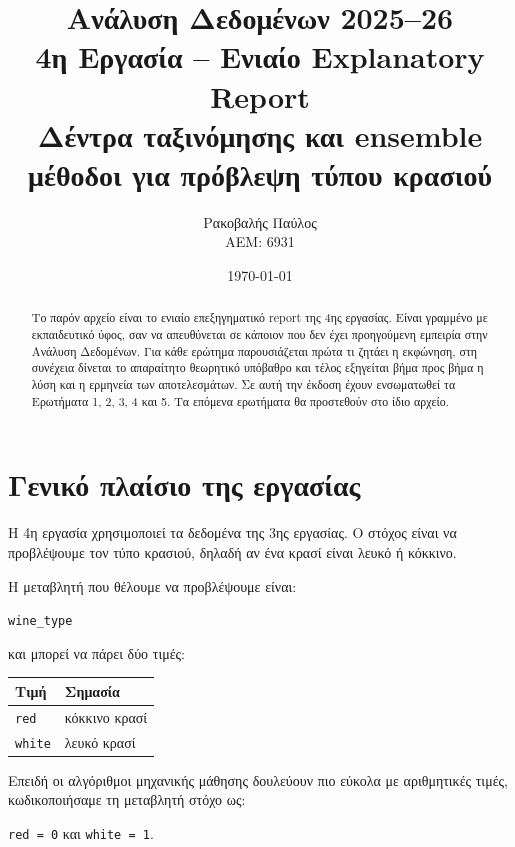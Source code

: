 \documentclass[12pt,a4paper]{article}
\title{
    \textbf{Ανάλυση Δεδομένων 2025--26}\\[0.25cm]
    \Large 4η Εργασία -- Ενιαίο Explanatory Report\\[0.15cm]
    \large Δέντρα ταξινόμησης και ensemble μέθοδοι για πρόβλεψη τύπου κρασιού
}
\author{
    Ρακοβαλής Παύλος\\
    ΑΕΜ: 6931
}
\date{\today}
\newcommand{\code}[1]{\texttt{\textenglish{#1}}}
\begin{document}
\maketitle
\thispagestyle{fancy}

\begin{abstract}
Το παρόν αρχείο είναι το ενιαίο επεξηγηματικό report της 4ης εργασίας. Είναι
γραμμένο με εκπαιδευτικό ύφος, σαν να απευθύνεται σε κάποιον που δεν έχει
προηγούμενη εμπειρία στην Ανάλυση Δεδομένων. Για κάθε ερώτημα παρουσιάζεται
πρώτα τι ζητάει η εκφώνηση, στη συνέχεια δίνεται το απαραίτητο θεωρητικό
υπόβαθρο και τέλος εξηγείται βήμα προς βήμα η λύση και η ερμηνεία των
αποτελεσμάτων. Σε αυτή την έκδοση έχουν ενσωματωθεί τα Ερωτήματα 1, 2, 3, 4
και 5.
Τα επόμενα ερωτήματα θα προστεθούν στο ίδιο αρχείο.
\end{abstract}

\tableofcontents
\newpage

\section{Γενικό πλαίσιο της εργασίας}

Η 4η εργασία χρησιμοποιεί τα δεδομένα της 3ης εργασίας. Ο στόχος είναι να
προβλέψουμε τον τύπο κρασιού, δηλαδή αν ένα κρασί είναι λευκό ή κόκκινο.

Η μεταβλητή που θέλουμε να προβλέψουμε είναι:

\begin{center}
\code{wine\_type}
\end{center}

και μπορεί να πάρει δύο τιμές:

\begin{center}
\begin{tabular}{ll}
\toprule
\textbf{Τιμή} & \textbf{Σημασία} \\
\midrule
\code{red} & κόκκινο κρασί \\
\code{white} & λευκό κρασί \\
\bottomrule
\end{tabular}
\end{center}

Επειδή οι αλγόριθμοι μηχανικής μάθησης δουλεύουν πιο εύκολα με αριθμητικές
τιμές, κωδικοποιήσαμε τη μεταβλητή στόχο ως:

\begin{center}
\code{red = 0} \hspace{1cm} και \hspace{1cm} \code{white = 1}.
\end{center}
\end{document}
